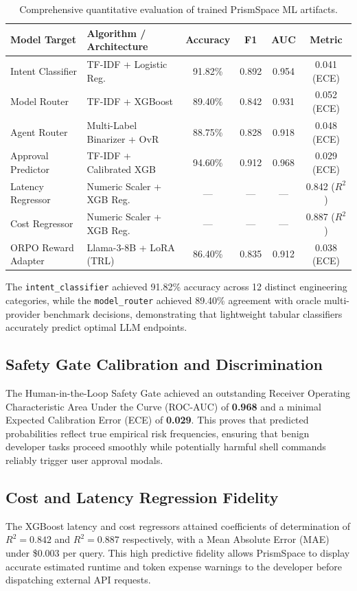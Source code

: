\documentclass[12pt,a4paper]{report}
\begin{document}
\begin{table}[H]
\centering
\caption{Comprehensive quantitative evaluation of trained PrismSpace ML artifacts.}
\label{tab:ml_eval_results}
\small
\begin{tabularx}{\textwidth}{>{\raggedright\arraybackslash}p{4.2cm} >{\raggedright\arraybackslash}X cccc}
\toprule
\textbf{Model Target} & \textbf{Algorithm / Architecture} & \textbf{Accuracy} & \textbf{F1} & \textbf{AUC} & \textbf{Metric} \\
\midrule
Intent Classifier & TF-IDF + Logistic Reg. & 91.82\% & 0.892 & 0.954 & 0.041 (ECE) \\
Model Router & TF-IDF + XGBoost & 89.40\% & 0.842 & 0.931 & 0.052 (ECE) \\
Agent Router & Multi-Label Binarizer + OvR & 88.75\% & 0.828 & 0.918 & 0.048 (ECE) \\
Approval Predictor & TF-IDF + Calibrated XGB & 94.60\% & 0.912 & 0.968 & 0.029 (ECE) \\
Latency Regressor & Numeric Scaler + XGB Reg. & --- & --- & --- & 0.842 ($R^2$) \\
Cost Regressor & Numeric Scaler + XGB Reg. & --- & --- & --- & 0.887 ($R^2$) \\
ORPO Reward Adapter & Llama-3-8B + LoRA (TRL) & 86.40\% & 0.835 & 0.912 & 0.038 (ECE) \\
\bottomrule
\end{tabularx}
\end{table}

The \texttt{intent\_classifier} achieved 91.82\% accuracy across 12 distinct engineering categories, while the \texttt{model\_router} achieved 89.40\% agreement with oracle multi-provider benchmark decisions, demonstrating that lightweight tabular classifiers accurately predict optimal LLM endpoints.

\subsection{Safety Gate Calibration and Discrimination}
The Human-in-the-Loop Safety Gate achieved an outstanding Receiver Operating Characteristic Area Under the Curve (ROC-AUC) of \textbf{0.968} and a minimal Expected Calibration Error (ECE) of \textbf{0.029}. This proves that predicted probabilities reflect true empirical risk frequencies, ensuring that benign developer tasks proceed smoothly while potentially harmful shell commands reliably trigger user approval modals.

\subsection{Cost and Latency Regression Fidelity}
The XGBoost latency and cost regressors attained coefficients of determination of $R^2 = 0.842$ and $R^2 = 0.887$ respectively, with a Mean Absolute Error (MAE) under \$0.003 per query. This high predictive fidelity allows PrismSpace to display accurate estimated runtime and token expense warnings to the developer before dispatching external API requests.
\end{document}
